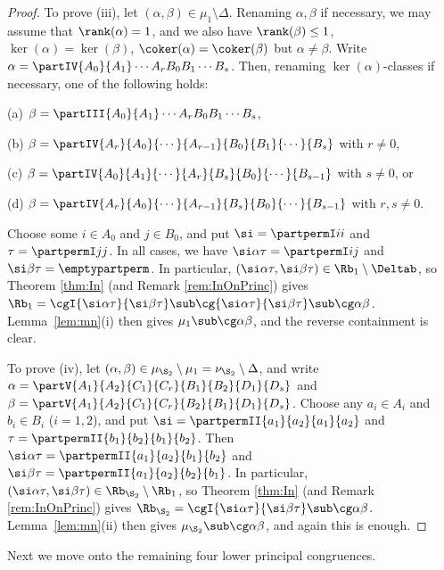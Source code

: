 \begin{proof}
To prove (iii), let $(\alpha,\beta)\in\mu_1\setminus\Delta$.
Renaming $\alpha,\beta$ if necessary, we may assume that $\rank(\alpha)=1$, and we also have $\rank(\beta)\leq1$, $\ker(\alpha)=\ker(\beta)$, $\coker(\alpha)=\coker(\beta)$ but $\alpha\not=\beta$.  Write $\alpha=\partIV{A_0}{A_1}\cdots{A_r}{B_0}{B_1}\cdots{B_s}$.  Then, renaming $\ker(\alpha)$-classes if necessary, one of the following holds:
\begin{itemize}\begin{multicols}{2}
\item[(a)] $\beta=\partIII{A_0}{A_1}\cdots{A_r}{B_0}{B_1}\cdots{B_s}$,
\item[(b)] $\beta = \partIV{A_r}{A_0}{\cdots}{A_{r-1}}{B_0}{B_1}{\cdots}{B_s}$ with $r\not=0$,
\item[(c)] $\beta = \partIV{A_0}{A_1}{\cdots}{A_r}{B_s}{B_0}{\cdots}{B_{s-1}}$ with $s\not=0$, or
\item[(d)] $\beta = \partIV{A_r}{A_0}{\cdots}{A_{r-1}}{B_s}{B_0}{\cdots}{B_{s-1}}$ with $r,s\not=0$.
\end{multicols}\end{itemize}
Choose some $i\in A_0$ and $j\in B_0$, and put $\si=\partpermI ii$ and $\tau=\partpermI jj$.  In all cases, we have $\si\alpha\tau=\partpermI ij$ and $\si\beta\tau = \emptypartperm$.  In particular, $(\si\alpha\tau,\si\beta\tau)\in\Rb_1\setminus\Deltab$, so Theorem \ref{thm:In} (and Remark \ref{rem:InOnPrinc}) gives $\Rb_1=\cgI{\si\alpha\tau}{\si\beta\tau}\sub\cg{\si\alpha\tau}{\si\beta\tau}\sub\cg\alpha\beta$.  Lemma~\ref{lem:mn}(i) then gives $\mu_1\sub\cg\alpha\beta$, and the reverse containment is clear.

To prove (iv), let $(\alpha,\beta)\in\mu_{\S_2}\setminus\mu_1=\nu_{\S_2}\setminus\Delta$, and write $\alpha=\partV{A_1}{A_2}{C_1}{C_r}{B_1}{B_2}{D_1}{D_s}$ and $\beta=\partV{A_1}{A_2}{C_1}{C_r}{B_2}{B_1}{D_1}{D_s}$.  Choose any $a_i\in A_i$ and $b_i\in B_i$ ($i=1,2$), and put $\si=\partpermII{a_1}{a_2}{a_1}{a_2}$ and $\tau=\partpermII{b_1}{b_2}{b_1}{b_2}$.  Then $\si\alpha\tau=\partpermII{a_1}{a_2}{b_1}{b_2}$ and $\si\beta\tau=\partpermII{a_1}{a_2}{b_2}{b_1}$.  In particular, $(\si\alpha\tau,\si\beta\tau)\in\Rb_{\S_2}\setminus\Rb_1$, so Theorem \ref{thm:In} (and Remark \ref{rem:InOnPrinc}) gives $\Rb_{\S_2}=\cgI{\si\alpha\tau}{\si\beta\tau}\sub\cg\alpha\beta$.  Lemma~\ref{lem:mn}(ii) then gives $\mu_{\S_2}\sub\cg\alpha\beta$, and again this is enough.  \end{proof}

Next we move onto the remaining four lower principal congruences.


